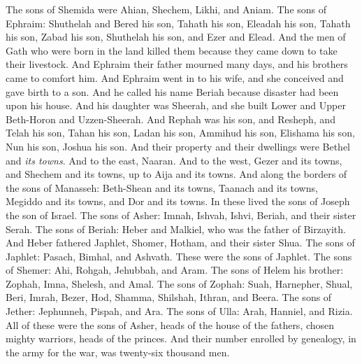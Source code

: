 \begin{biblechapter}
\verse The sons of Shemida were Ahian, Shechem, Likhi, and Aniam.
 The sons of Ephraim: Shuthelah and Bered his son, Tahath his son, Eleadah his son, Tahath his son,
\verse Zabad his son, Shuthelah his son, and Ezer and Elead. And the men of Gath who were born in the land killed them because they came down to take their livestock.
\verse And Ephraim their father mourned many days, and his brothers came to comfort him.
\verse And Ephraim went in to his wife, and she conceived and gave birth to a son. And he called his name Beriah because disaster had been upon his house.
\verse And his daughter was Sheerah, and she built Lower and Upper Beth-Horon and Uzzen-Sheerah.
\verse And Rephah was his son, and Resheph, and Telah his son, Tahan his son,
\verse Ladan his son, Ammihud his son, Elishama his son,
\verse Nun his son, Joshua his son.
\verse And their property and their dwellings were Bethel and \textit{its towns}. And to the east, Naaran. And to the west, Gezer and its towns, and Shechem and its towns, up to Aija and its towns.
\verse And along the borders of the sons of Manasseh: Beth-Shean and its towns, Taanach and its towns, Megiddo and its towns, and Dor and its towns. In these lived the sons of Joseph the son of Israel.
 The sons of Asher: Imnah, Ishvah, Ishvi, Beriah, and their sister Serah.
\verse The sons of Beriah: Heber and Malkiel, who was the father of Birzayith.
\verse And Heber fathered Japhlet, Shomer, Hotham, and their sister Shua.
\verse The sons of Japhlet: Pasach, Bimhal, and Ashvath. These were the sons of Japhlet.
\verse The sons of Shemer: Ahi, Rohgah, Jehubbah, and Aram.
\verse The sons of Helem his brother: Zophah, Imna, Shelesh, and Amal.
\verse The sons of Zophah: Suah, Harnepher, Shual, Beri, Imrah,
\verse Bezer, Hod, Shamma, Shilshah, Ithran, and Beera.
\verse The sons of Jether: Jephunneh, Pispah, and Ara.
\verse The sons of Ulla: Arah, Hanniel, and Rizia.
\verse All of these were the sons of Asher, heads of the house of the fathers, chosen mighty warriors, heads of the princes. And their number enrolled by genealogy, in the army for the war, was twenty-six thousand men.
\end{biblechapter}

